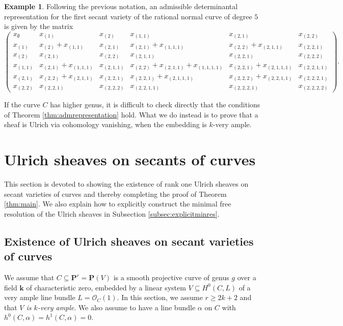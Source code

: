 \documentclass[12pt]{amsart}
\newcounter{thmcounter}
\numberwithin{equation}{section}
\numberwithin{thmcounter}{section}
\theoremstyle{definition}
\newtheorem{example}[thmcounter]{Example}
\theoremstyle{claim}
\newcommand{\kk}{\mathbf{k}}
\newcommand{\nP}{\mathbf{P}}
\newcommand{\sO}{\mathscr{O}}
\begin{document}
\begin{example}Following the previous notation, an admissible determinantal representation for the first secant variety of the rational normal curve of degree $5$ is given by the matrix
	\[
	 \begin{pmatrix}
		x_{{\emptyset}} & x_{{(1)}} & x_{{(2)}} & x_{{(1,1)}} & x_{{(2,1)}} & x_{{(2,2)}} \\
		x_{{(1)}} & x_{{(2)}} + x_{{(1,1)}} & x_{{(2,1)}} & x_{{(2,1)}} + x_{{(1,1,1)}} & x_{{(2,2)}} + x_{{(2,1,1)}} & x_{{(2,2,1)}} \\
		x_{{(2)}} & x_{{(2,1)}} & x_{{(2,2)}} & x_{{(2,1,1)}} & x_{{(2,2,1)}} & x_{{(2,2,2)}} \\
		x_{{(1,1)}} & x_{{(2,1)}} + x_{{(1,1,1)}} & x_{{(2,1,1)}} & x_{{(2,2)}} + x_{{(2,1,1)}} + x_{{(1,1,1,1)}} & x_{{(2,2,1)}} + x_{{(2,1,1,1)}} & x_{{(2,2,1,1)}} \\
		x_{{(2,1)}} & x_{{(2,2)}} + x_{{(2,1,1)}} & x_{{(2,2,1)}} & x_{{(2,2,1)}} + x_{{(2,1,1,1)}} & x_{{(2,2,2)}} + x_{{(2,2,1,1)}} & x_{{(2,2,2,1)}} \\
		x_{{(2,2)}} & x_{{(2,2,1)}} & x_{{(2,2,2)}} & x_{{(2,2,1,1)}} & x_{{(2,2,2,1)}} & x_{{(2,2,2,2)}}
	\end{pmatrix}.
	\]
\end{example}

If the curve $C$ has higher genus, it is difficult to check directly that the conditions of Theorem \ref{thm:admrepresentation} hold. What we do instead is to prove that a sheaf is Ulrich via cohomology vanishing, when the embedding is $k$-very ample.

\section{Ulrich sheaves on secants of curves}\label{sec:constulrich}
\noindent This section is devoted to showing the existence of rank one Ulrich sheaves on secant varieties of curves and thereby completing the proof of Theorem \ref{thm:main}. We also explain how to explicitly construct the minimal free resolution of the Ulrich sheaves in Subsection \ref{subsec:explicitminres}.


\subsection{Existence of Ulrich sheaves on secant varieties of curves}
We assume that  $C\subseteq \nP^r=\nP(V)$ is a smooth projective curve of genus $g$ over a field $\kk$ of characteristic zero,  embedded by a linear system $V\subseteq H^0(C,L)$ of a very ample line bundle $L=\sO_C(1)$. In this section, we assume $r\geq2k+2$ and that \emph{$V$ is $k$-very ample}.
We also assume to have a line bundle $\alpha$ on $C$ with $h^0(C,\alpha)=h^1(C,\alpha)=0$.
\end{document}
